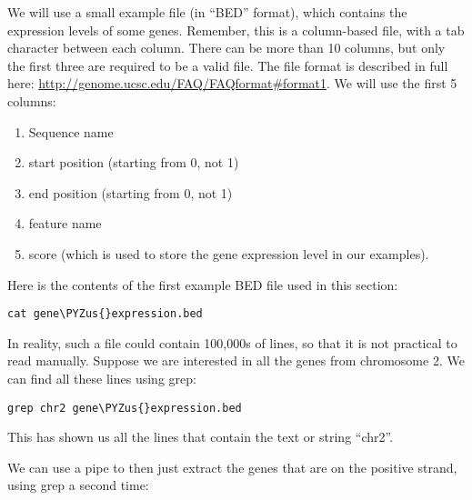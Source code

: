 \documentclass[11pt]{article}
\makeatletter
\providecommand{\tightlist}{%
      \setlength{\itemsep}{0pt}\setlength{\parskip}{0pt}}
\def\PYZus{\char`\_}
\newcommand{\boxspacing}{\kern\kvtcb@left@rule\kern\kvtcb@boxsep}
\newcommand{\prompt}[4]{
        {\ttfamily\llap{{\color{blue}\LARGE\faKeyboardO\hspace{3pt}#4}}\vspace{-\baselineskip}}
    }
\makeatother
\begin{document}
We will use a small example file (in ``BED'' format), which contains the
expression levels of some genes. Remember, this is a column-based file,
with a tab character between each column. There can be more than 10
columns, but only the first three are required to be a valid file. The
file format is described in full here:
\url{http://genome.ucsc.edu/FAQ/FAQformat\#format1}. We will use the
first 5 columns:

\begin{enumerate}
\def\labelenumi{\arabic{enumi}.}
\tightlist
\item
  Sequence name
\item
  start position (starting from 0, not 1)
\item
  end position (starting from 0, not 1)
\item
  feature name
\item
  score (which is used to store the gene expression level in our
  examples).
\end{enumerate}

Here is the contents of the first example BED file used in this section:

    \begin{tcolorbox}[breakable, size=fbox, boxrule=1pt, pad at break*=1mm,colback=cellbackground, colframe=cellborder]
\prompt{In}{incolor}{ }{\boxspacing}
\begin{Verbatim}[commandchars=\\\{\}]
cat gene\PYZus{}expression.bed
\end{Verbatim}
\end{tcolorbox}

    In reality, such a file could contain 100,000s of lines, so that it is
not practical to read manually. Suppose we are interested in all the
genes from chromosome 2. We can find all these lines using grep:

    \begin{tcolorbox}[breakable, size=fbox, boxrule=1pt, pad at break*=1mm,colback=cellbackground, colframe=cellborder]
\prompt{In}{incolor}{ }{\boxspacing}
\begin{Verbatim}[commandchars=\\\{\}]
grep chr2 gene\PYZus{}expression.bed
\end{Verbatim}
\end{tcolorbox}

    This has shown us all the lines that contain the text or string
``chr2''.

We can use a pipe to then just extract the genes that are on the
positive strand, using grep a second time:
\end{document}
